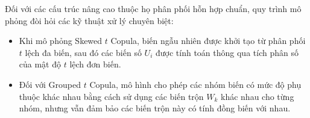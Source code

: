 Đối với các cấu trúc nâng cao thuộc họ phân phối hỗn hợp chuẩn, quy trình mô phỏng đòi hỏi các kỹ thuật xử lý chuyên biệt:
\begin{itemize}
    \item Khi mô phỏng Skewed $t$ Copula, biến ngẫu nhiên được khởi tạo từ phân phối $t$ lệch đa biến, sau đó các biến số $U_i$ được tính toán thông qua tích phân số của mật độ $t$ lệch đơn biến.
    \item Đối với Grouped $t$ Copula, mô hình cho phép các nhóm biến có mức độ phụ thuộc khác nhau bằng cách sử dụng các biến trộn $W_k$ khác nhau cho từng nhóm, nhưng vẫn đảm bảo các biến trộn này có tính đồng biến với nhau.
\end{itemize}
